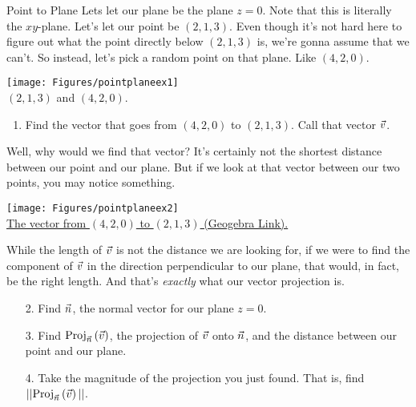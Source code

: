 \begin{exercise}{Point to Plane}
Lets let our plane be the plane $z=0$. Note that this is literally the $xy$-plane. Let's let our point be $(2,1,3)$. Even though it's not hard here to figure out what the point directly below $(2,1,3)$ is, we're gonna assume that we can't. So instead, let's pick a random point on that plane. Like $(4,2,0)$.
\begin{center}
    \texttt{[image: Figures/pointplaneex1]}\\$(2,1,3)$ and $(4,2,0)$.
\end{center}
\vspace{1em}
\begin{enumerate}
\item Find the vector that goes from $(4,2,0)$ to $(2,1,3)$. Call that vector $\vec{v}$.
\vspace{1em}
\end{enumerate}
Well, why would we find that vector? It's certainly not the shortest distance between our point and our plane. But if we look at that vector between our two points, you may notice something.
\vspace{1em}
\begin{center}
    \texttt{[image: Figures/pointplaneex2]}\\\href{https://www.geogebra.org/3d/kdsbfgck}{The vector from $(4,2,0)$ to $(2,1,3)$ (Geogebra Link).}
\end{center}
\vspace{1em}
While the length of $\vec{v}$ is not the distance we are looking for, if we were to find the component of $\vec{v}$ in the direction perpendicular to our plane, that would, in fact, be the right length. And that's \textit{exactly} what our vector projection is.
\vspace{1em}
\begin{enumerate}
\item[2.] Find $\vec{n}$, the normal vector for our plane $z=0$.
\vspace{1em}
\item[3.] Find $\mathrm{Proj}_{\vec{n}}\left({\vec{v}}\right)$, the projection of $\vec{v}$ onto $\vec{n}$, and the distance between our point and our plane.
\vspace{1em}
\item[4.] Take the magnitude of the projection you just found. That is, find $|| \mathrm{Proj}_{\vec{n}}\left({\vec{v}}\right)||$.
\end{enumerate}
\end{exercise}

